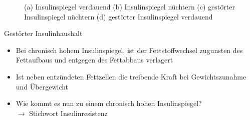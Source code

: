 \documentclass[xcolor=dvipsnames]{beamer}
\begin{document}
\begin{frame}[allowframebreaks]
        \framebreak

        \begin{figure}
            \centering
            \caption{(a) Insulinspiegel verdauend (b) Insulinspiegel nüchtern (c) gestörter Insulinspiegel nüchtern (d) gestörter Insulinspiegel verdauend}
        \end{figure}

        \framebreak

        \begin{block}{Gestörter Insulinhaushalt}
            \begin{itemize}
                \setlength\itemsep{1em}
                \item Bei chronisch hohem Insulinspiegel, ist der Fettstoffwechsel zugunsten des Fettaufbaus und entgegen des Fettabbaus verlagert
                \item Ist neben entzündeten Fettzellen die treibende Kraft bei Gewichtszunahme und Übergewicht
                \item Wie kommt es nun zu einem chronisch hohen Insulinspiegel?\\ $\rightarrow$ Stichwort Insulinresistenz
            \end{itemize}
        \end{block}
    \end{frame}
\end{document}

